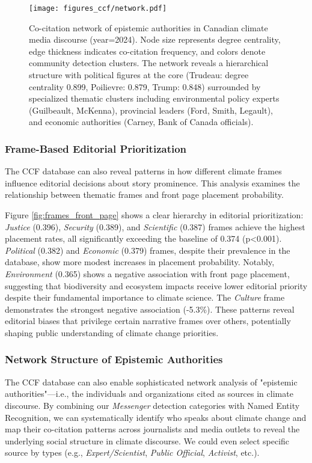 \documentclass[12pt]{article}
\begin{document}
\begin{figure}[b!]
\centering
\texttt{[image: figures\_ccf/network.pdf]}
\caption{Co-citation network of epistemic authorities in Canadian climate media discourse (year=2024). Node size represents degree centrality, edge thickness indicates co-citation frequency, and colors denote community detection clusters. The network reveals a hierarchical structure with political figures at the core (Trudeau: degree centrality 0.899, Poilievre: 0.879, Trump: 0.848) surrounded by specialized thematic clusters including environmental policy experts (Guilbeault, McKenna), provincial leaders (Ford, Smith, Legault), and economic authorities (Carney, Bank of Canada officials).}
\label{fig:network}
\end{figure}

\subsubsection{Frame-Based Editorial Prioritization}

The CCF database can also reveal patterns in how different climate frames influence editorial decisions about story prominence. This analysis examines the relationship between thematic frames and front page placement probability.

Figure \ref{fig:frames_front_page} shows a clear hierarchy in editorial prioritization: \emph{Justice} (0.396), \emph{Security} (0.389), and \emph{Scientific} (0.387) frames achieve the highest placement rates, all significantly exceeding the baseline of 0.374 (p<0.001). \emph{Political} (0.382) and \emph{Economic} (0.379) frames, despite their prevalence in the database, show more modest increases in placement probability. Notably, \emph{Environment} (0.365) shows a negative association with front page placement, suggesting that biodiversity and ecosystem impacts receive lower editorial priority despite their fundamental importance to climate science. The \emph{Culture} frame demonstrates the strongest negative association (-5.3\%). These patterns reveal editorial biases that privilege certain narrative frames over others, potentially shaping public understanding of climate change priorities. 

\subsubsection{Network Structure of Epistemic Authorities}

The CCF database can also enable sophisticated network analysis of "epistemic authorities"—i.e., the individuals and organizations cited as sources in climate discourse. By combining our \emph{Messenger} detection categories with Named Entity Recognition, we can systematically identify who speaks about climate change and map their co-citation patterns across journalists and media outlets to reveal the underlying social structure in climate discourse. We could even select specific source by types (e.g., \emph{Expert/Scientist}, \emph{Public Official}, \emph{Activist}, etc.). 
\end{document}
